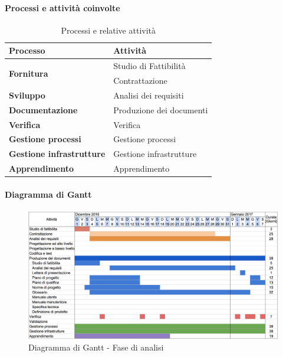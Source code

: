 		\paragraph{Processi e attività coinvolte}
			\begin{table}[H]
				\centering
				\begin{tabular}{ll}
					\toprule
					\textbf{Processo}                           & \textbf{Attività}              \\
					\midrule
					\multirow{2}{*}{\textbf{Fornitura}}         & Studio di Fattibilità          \\
					& Contrattazione                 \\
					\midrule
					\textbf{Sviluppo}          & Analisi dei requisiti          \\
					\midrule
					\textbf{Documentazione}            & Produzione dei documenti       \\
					\midrule
					\textbf{Verifica}                  & Verifica                       \\
					\midrule
					\textbf{Gestione processi} 					& Gestione processi              \\
					\midrule
					\textbf{Gestione infrastrutture}				& Gestione infrastrutture        \\
					\midrule
					\textbf{Apprendimento} 						& Apprendimento                 \\
					\bottomrule
				\end{tabular}
				\caption{Processi e relative attività}
				\label{An-ProcessiAttività}
			\end{table}
		\paragraph{Diagramma di Gantt}
		\begin{figure}[H]
			\centering
			\includegraphics[width=\textwidth]{img/Gantt/f1c.png}
			\caption{Diagramma di Gantt - Fase di analisi}
		\end{figure}
